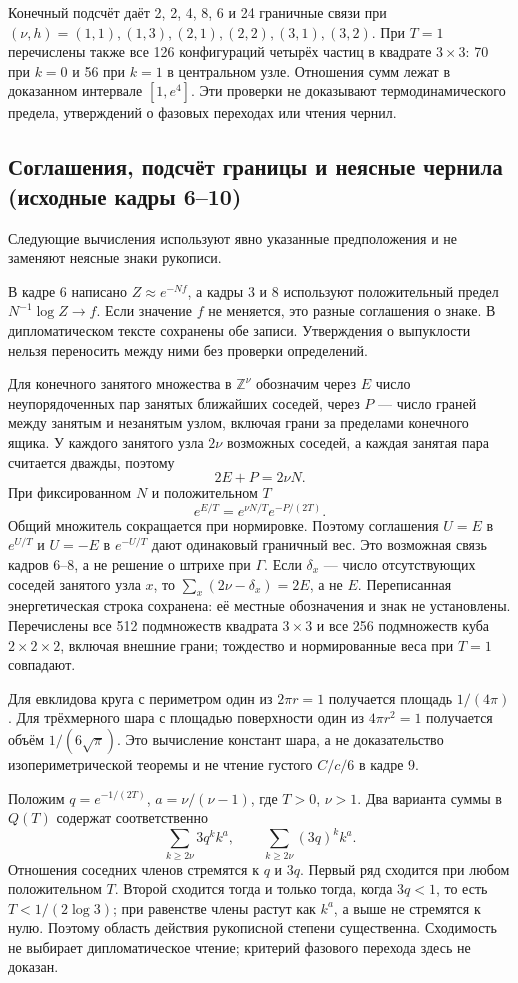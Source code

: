 \documentclass[11pt]{article}
\begin{document}
Конечный подсчёт даёт 2, 2, 4, 8, 6 и 24 граничные связи при \((\nu,h)=(1,1),(1,3),(2,1),(2,2),(3,1),(3,2)\). При \(T=1\) перечислены также все 126 конфигураций четырёх частиц в квадрате \(3\times3\): 70 при \(k=0\) и 56 при \(k=1\) в центральном узле. Отношения сумм лежат в доказанном интервале \([1,e^4]\). Эти проверки не доказывают термодинамического предела, утверждений о фазовых переходах или чтения чернил.

\subsection*{Соглашения, подсчёт границы и неясные чернила (исходные кадры 6–10)}
Следующие вычисления используют явно указанные предположения и не заменяют неясные знаки рукописи.

В кадре 6 написано \(Z\approx e^{-Nf}\), а кадры 3 и 8 используют положительный предел \(N^{-1}\log Z\to f\). Если значение \(f\) не меняется, это разные соглашения о знаке. В дипломатическом тексте сохранены обе записи. Утверждения о выпуклости нельзя переносить между ними без проверки определений.

Для конечного занятого множества в \(\mathbb Z^\nu\) обозначим через \(E\) число неупорядоченных пар занятых ближайших соседей, через \(P\) — число граней между занятым и незанятым узлом, включая грани за пределами конечного ящика. У каждого занятого узла \(2\nu\) возможных соседей, а каждая занятая пара считается дважды, поэтому
\[2E+P=2\nu N.\]
При фиксированном \(N\) и положительном \(T\)
\[e^{E/T}=e^{\nu N/T}e^{-P/(2T)}.\]
Общий множитель сокращается при нормировке. Поэтому соглашения \(U=E\) в \(e^{U/T}\) и \(U=-E\) в \(e^{-U/T}\) дают одинаковый граничный вес. Это возможная связь кадров 6–8, а не решение о штрихе при \(\Gamma\). Если \(\delta_x\) — число отсутствующих соседей занятого узла \(x\), то \(\sum_x(2\nu-\delta_x)=2E\), а не \(E\). Переписанная энергетическая строка сохранена: её местные обозначения и знак не установлены. Перечислены все 512 подмножеств квадрата \(3\times3\) и все 256 подмножеств куба \(2\times2\times2\), включая внешние грани; тождество и нормированные веса при \(T=1\) совпадают.

Для евклидова круга с периметром один из \(2\pi r=1\) получается площадь \(1/(4\pi)\). Для трёхмерного шара с площадью поверхности один из \(4\pi r^2=1\) получается объём \(1/(6\sqrt\pi)\). Это вычисление констант шара, а не доказательство изопериметрической теоремы и не чтение густого \(C/c/6\) в кадре 9.

Положим \(q=e^{-1/(2T)}\), \(a=\nu/(\nu-1)\), где \(T>0\), \(\nu>1\). Два варианта суммы в \(Q(T)\) содержат соответственно
\[\sum_{k\ge2\nu}3q^k k^a,\qquad
 \sum_{k\ge2\nu}(3q)^k k^a.\]
Отношения соседних членов стремятся к \(q\) и \(3q\). Первый ряд сходится при любом положительном \(T\). Второй сходится тогда и только тогда, когда \(3q<1\), то есть \(T<1/(2\log3)\); при равенстве члены растут как \(k^a\), а выше не стремятся к нулю. Поэтому область действия рукописной степени существенна. Сходимость не выбирает дипломатическое чтение; критерий фазового перехода здесь не доказан.
\end{document}
